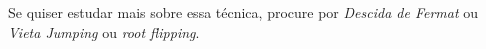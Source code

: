 \documentclass[10pt, a4paper]{article}
\begin{document}
	\begin{rem}
		Se quiser estudar mais sobre essa técnica, procure por \emph{Descida de Fermat} ou \emph{Vieta Jumping} ou \emph{root flipping}.
	\end{rem}








\end{document}
